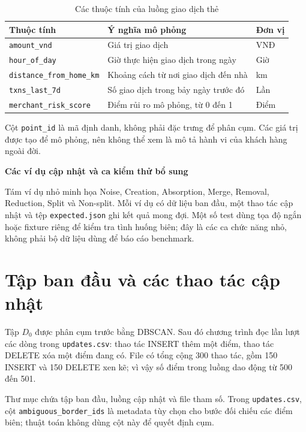 \begin{table}[H]
\centering
\caption{Các thuộc tính của luồng giao dịch thẻ}
\label{tab:card_features}
\normalsize
\begin{tabularx}{\textwidth}{|P{5cm}|Y|P{1.7cm}|}\hline
\textbf{Thuộc tính} & \textbf{Ý nghĩa mô phỏng} & \textbf{Đơn vị} \\\hline
\texttt{amount\_vnd} & Giá trị giao dịch & VNĐ \\\hline
\texttt{hour\_of\_day} & Giờ thực hiện giao dịch trong ngày & Giờ \\\hline
\texttt{distance\_from\_home\_km} & Khoảng cách từ nơi giao dịch đến nhà & km \\\hline
\texttt{txns\_last\_7d} & Số giao dịch trong bảy ngày trước đó & Lần \\\hline
\texttt{merchant\_risk\_score} & Điểm rủi ro mô phỏng, từ 0 đến 1 & Điểm \\\hline
\end{tabularx}
\end{table}

Cột \texttt{point\_id} là mã định danh, không phải đặc trưng để phân cụm. Các giá trị được tạo để mô phỏng, nên không thể xem là mô tả hành vi của khách hàng ngoài đời.

\textbf{Các ví dụ cập nhật và ca kiểm thử bổ sung} 

Tám ví dụ nhỏ minh họa Noise, Creation, Absorption, Merge, Removal, Reduction, Split và Non-split. Mỗi ví dụ có dữ liệu ban đầu, một thao tác cập nhật và tệp \texttt{expected.json} ghi kết quả mong đợi. Một số test dùng tọa độ ngắn hoặc fixture riêng để kiểm tra tình huống biên; đây là các ca chức năng nhỏ, không phải bộ dữ liệu dùng để báo cáo benchmark.

\section{Tập ban đầu và các thao tác cập nhật}

Tập \(D_0\) được phân cụm trước bằng DBSCAN. Sau đó chương trình đọc lần lượt các dòng trong \texttt{updates.csv}: thao tác INSERT thêm một điểm, thao tác DELETE xóa một điểm đang có. File có tổng cộng 300 thao tác, gồm 150 INSERT và 150 DELETE xen kẽ; vì vậy số điểm trong luồng dao động từ 500 đến 501.

Thư mục  chứa tập ban đầu, luồng cập nhật và file tham số. Trong \texttt{updates.csv}, cột \texttt{ambiguous\_border\_ids} là metadata tùy chọn cho bước đối chiếu các điểm biên; thuật toán không dùng cột này để quyết định cụm.

